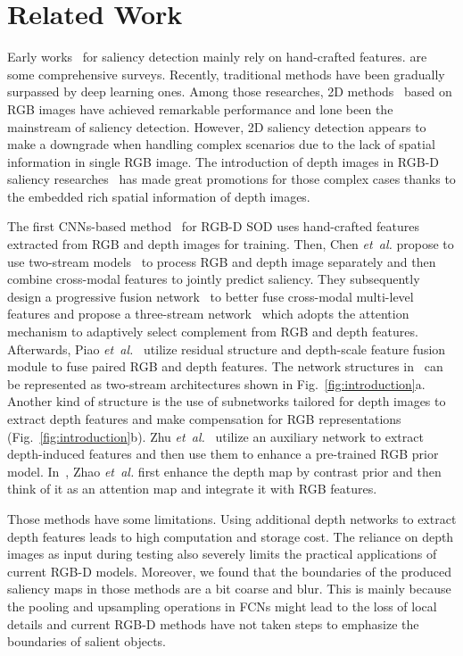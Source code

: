 \documentclass[runningheads]{llncs}
\begin{document}
\section{Related Work}
Early works~\cite{2DT1,2DT2,2DT6,2DData1,2DData2} for saliency detection mainly rely on hand-crafted features.
\cite{2DF,Benchmark,2DDeep} are some comprehensive surveys.
Recently, traditional methods have been gradually surpassed by deep learning ones.
Among those researches, 2D methods~\cite{2DLi,2DData3,2DWang,2DZhao,2DLee,2DT8,2DwangDVAP,2DwangFP,2DSOC,2DNLDF,2DCPD} based on RGB images have achieved remarkable performance and lone been the mainstream of saliency detection.
However, 2D saliency detection appears to make a downgrade when handling complex scenarios due to the lack of spatial information in single RGB image.
The introduction of depth images in RGB-D saliency researches~\cite{3DGP,3DTPPF,3DDF,3DCTMF,3DMPCI,3DPCA,3DTANet,3DPDNet,3DDMRA,3DCPFP} has made great promotions for those complex cases thanks to the embedded rich spatial information of depth images.


The first CNNs-based method~\cite{3DDF} for RGB-D SOD uses hand-crafted features extracted from RGB and depth images for training.
Then, Chen \emph{et~al.} propose to use two-stream models~\cite{3DCTMF,3DMPCI} to process RGB and depth image separately and then combine cross-modal features to jointly predict saliency.
They subsequently design a progressive fusion network~\cite{3DPCA} to better fuse cross-modal multi-level features and propose a three-stream network~\cite{3DTANet} which adopts the attention mechanism to adaptively select complement from RGB and depth features.
Afterwards,
Piao \emph{et~al.}~\cite{3DDMRA} utilize residual structure and depth-scale feature fusion module to fuse paired RGB and depth features. 
The network structures in~\cite{3DCTMF,3DMPCI,3DPCA,3DTANet,3DDMRA} can be represented as two-stream architectures shown in Fig.~\ref{fig:introduction}a.
Another kind of structure is the use of subnetworks tailored for depth images to extract depth features and make compensation for RGB representations~\cite{3DPDNet,3DCPFP} (Fig.~\ref{fig:introduction}b).
Zhu \emph{et~al.}~\cite{3DPDNet} utilize an auxiliary network to extract depth-induced features and then use them to enhance a pre-trained RGB prior model.
In~\cite{3DCPFP}, Zhao \emph{et~al.} first enhance the depth map by contrast prior and then think of it as an attention map and integrate it with RGB features.

Those methods have some limitations.
Using additional depth networks to extract depth features leads to high computation and storage cost.
The reliance on depth images as input during testing also severely limits the practical applications of current RGB-D models.
Moreover, we found that the boundaries of the produced saliency maps in those methods are a bit coarse and blur.
This is mainly because the pooling and upsampling operations in FCNs might lead to the loss of local details and current RGB-D methods have not taken steps to emphasize the boundaries of salient objects.
\end{document}
